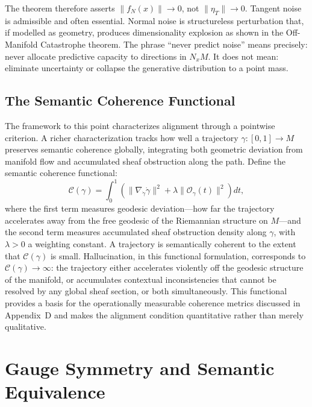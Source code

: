 \documentclass[11pt,a4paper,twocolumn]{article}
\begin{document}
The theorem therefore asserts $\|f_N(x)\| \to 0$, not $\|\eta_T\| \to 0$.
Tangent noise is admissible and often essential. Normal noise
is structureless perturbation that, if modelled as geometry,
produces dimensionality explosion as shown in the
Off-Manifold Catastrophe theorem. The phrase ``never predict
noise'' means precisely: never allocate predictive capacity to
directions in $N_x M$. It does not mean: eliminate uncertainty
or collapse the generative distribution to a point mass.

\subsection{The Semantic Coherence Functional}

The framework to this point characterizes alignment through a
pointwise criterion. A richer characterization tracks how
well a trajectory $\gamma : [0,1] \to M$ preserves semantic
coherence globally, integrating both geometric deviation
from manifold flow and accumulated sheaf obstruction along
the path. Define the semantic coherence functional:
\[
\mathcal{C}(\gamma)
=
\int_0^1
\left(
\|\nabla_{\dot{\gamma}}\dot{\gamma}\|^2
+
\lambda \|\mathcal{O}_\gamma(t)\|^2
\right) dt,
\]
where the first term measures geodesic deviation---how far
the trajectory accelerates away from the free geodesic of the
Riemannian structure on $M$---and the second term measures
accumulated sheaf obstruction density along $\gamma$, with
$\lambda > 0$ a weighting constant. A trajectory is
semantically coherent to the extent that $\mathcal{C}(\gamma)$
is small. Hallucination, in this functional formulation,
corresponds to $\mathcal{C}(\gamma) \to \infty$: the
trajectory either accelerates violently off the geodesic
structure of the manifold, or accumulates contextual
inconsistencies that cannot be resolved by any global
sheaf section, or both simultaneously. This functional
provides a basis for the operationally measurable coherence
metrics discussed in Appendix~D and makes the alignment
condition quantitative rather than merely qualitative.


\section{Gauge Symmetry and Semantic Equivalence}
\end{document}

